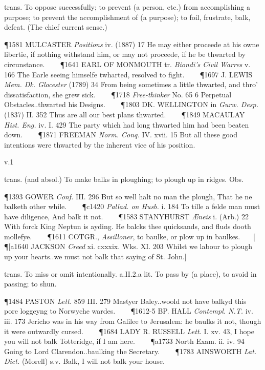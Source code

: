 \begin{description}[wide, labelwidth=!, labelindent=0pt]
\begin{myenumerate}
 trans. To oppose successfully; to prevent (a person, etc.) from accomplishing a purpose; to prevent the accomplishment of (a purpose); to foil, frustrate, balk, defeat. (The chief current sense.)

\P 1581 MULCASTER  \textit{Positions} iv. (1887) 17 He may either proceede at his owne libertie, if nothing withstand him, or may not proceede, if he be thwarted by circunstance.    
\P 1641 EARL OF MONMOUTH  tr. \textit{Biondi's Civil Warres} v. 166 The Earle seeing himselfe twharted, resolved to fight.    
\P 1697 J. LEWIS  \textit{Mem. Dk. Glocester} (1789) 34 From being sometimes a little thwarted, and thro' dissatisfaction, she grew sick.    
\P 1718  \textit{Free-thinker} No. 65 6 Perpetual Obstacles..thwarted his Designs.    
\P 1803 DK. WELLINGTON in  \textit{Gurw. Desp.} (1837) II. 352 Thus are all our best plans thwarted.    
\P 1849 MACAULAY  \textit{Hist. Eng.} iv. I. 429 The party which had long thwarted him had been beaten down.    
\P 1871 FREEMAN  \textit{Norm. Conq.} IV. xvii. 15 But all these good intentions were thwarted by the inherent vice of his position.
\end{myenumerate}


 v.1

\noindent {}

\vspace{-0.3cm}

\begin{myenumerate}

 trans. (and absol.) To make balks in ploughing; to plough up in ridges. Obs.

\P 1393 GOWER  \textit{Conf.} III. 296 But so well halt no man the plough, That he ne balketh other while.    
\P c1420 \textit{Pallad. on Husb.} i. 184 To tille a felde man must have diligence, And balk it not.    
\P 1583 STANYHURST  \textit{Æneis} i. (Arb.) 22 With forck King Neptun is ayding. He balcks thee quicksands, and fluds dooth mollefye.    
\P 1611 COTGR.,  \textit{Assilloner}, to baulke, or plow up in baulkes.    [
\P [a1640 JACKSON \textit{Creed} xi. cxxxix. Wks. XI. 203 Whilst we labour to plough up your hearts..we must not balk that saying of St. John.]

 trans. To miss or omit intentionally. a.II.2.a lit. To pass by (a place), to avoid in passing; to shun.

\P 1484 PASTON  \textit{Lett.} 859 III. 279 Mastyer Baley..woold not have balkyd this pore loggeyng to Norwyche wardes.    
\P 1612-5 BP. HALL \textit{Contempl. N.T.} iv. iii. 173 Jericho was in his way from Galilee to Jerusalem: he baulks it not, though it were outwardly cursed.    
\P 1684 LADY  R. RUSSELL \textit{Lett.} I. xv. 43, I hope you will not balk Totteridge, if I am here.    
\P a1733 North Exam. ii. iv. 94 Going to Lord Clarendon..baulking the Secretary.    
\P 1783 AINSWORTH  \textit{Lat. Dict.} (Morell) s.v. Balk, I will not balk your house.


\end{myenumerate}
\end{description}
